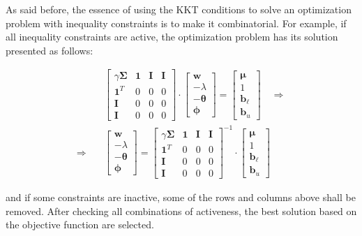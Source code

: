 \documentclass{beamer}
\begin{document}
\begin{frame}

\justifying
As said before, the essence of using the KKT conditions to solve an optimization problem with inequality constraints is to make it combinatorial. For example, if all inequality constraints are active, the optimization problem has its solution presented as follows:

\justifying
\begin{equation*}
\begin{aligned}
	& \begin{bmatrix}
		\gamma\mathbf{\Sigma} & \mathbf{1} & \mathbf{I} & \mathbf{I} \\
		\mathbf{1}^{T} & 0 & 0 & 0 \\
		\mathbf{I} & 0 & 0 & 0 \\
		\mathbf{I} & 0 & 0 & 0
	   \end{bmatrix}
	   \cdot
	   \begin{bmatrix}
	   	\mathbf{w} \\
		-\lambda \\
		-\boldsymbol\theta \\
		\boldsymbol\phi
	  \end{bmatrix}
	  =
	  \begin{bmatrix}
	  	\boldsymbol\mu \\ 
		1 \\
		\mathbf{b}_{\ell} \\
		\mathbf{b}_{u}
	\end{bmatrix}
	\quad \Rightarrow \\
	\Rightarrow \quad &
	\begin{bmatrix}
	   	\mathbf{w} \\
		-\lambda \\
		-\boldsymbol\theta \\
		\boldsymbol\phi
	  \end{bmatrix}
	  =
	  \begin{bmatrix}
		\gamma\mathbf{\Sigma} & \mathbf{1} & \mathbf{I} & \mathbf{I} \\
		\mathbf{1}^{T} & 0 & 0 & 0 \\
		\mathbf{I} & 0 & 0 & 0 \\
		\mathbf{I} & 0 & 0 & 0
	   \end{bmatrix}^{-1}
	   \cdot
	  \begin{bmatrix}
	  	\boldsymbol\mu \\ 
		1 \\
		\mathbf{b}_{\ell} \\
		\mathbf{b}_{u}
	\end{bmatrix}
\end{aligned}
\end{equation*}

\justifying
and if some constraints are inactive, some of the rows and columns above shall be removed. After checking all combinations of activeness, the best solution based on the objective function are selected.

\end{frame}
\end{document}
